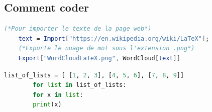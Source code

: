 \documentclass[french, babel]{article}
\begin{document}
\subsection[Sous-section]{Comment coder}
	\lipsum[15-16]
	\begin{lstlisting}[language=Mathematica, caption=Example Mathematica]
	(*Pour importer le texte de la page web*)
	text = Import["https://en.wikipedia.org/wiki/LaTeX"];
	(*Exporte le nuage de mot sous l'extension .png*)
	Export["WordCloudLaTeX.png", WordCloud[text]]
	\end{lstlisting}
	\begin{multicols}{3}
		\lipsum[16-17]
	\end{multicols}
	\begin{lstlisting}[language=Python,caption={Exemple Python\protect\footnotemark\relax}]
		list_of_lists = [ [1, 2, 3], [4, 5, 6], [7, 8, 9]]
		for list in list_of_lists:
		for x in list:
		print(x)
	\end{lstlisting}
	\begin{multicols}{3}
		\lipsum[17-18]
	\end{multicols}
\pagebreak

{
	\let\footnotemark\relax
	\lstlistoflistings
}
	\listoffigures
	
\end{document}
